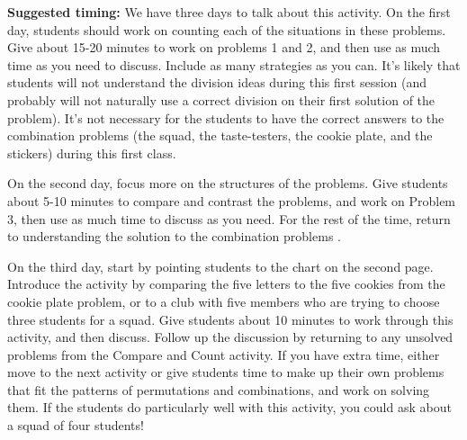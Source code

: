 \documentclass[nooutcomes, noauthor]{ximera}
\begin{document}
\begin{instructorNotes}
{\bf Suggested timing:} We have three days to talk about this activity. On the first day, students should work on counting each of the situations in these problems. Give about 15-20 minutes to work on problems 1 and 2, and then use as much time as you need to discuss. Include as many strategies as you can. It's likely that students will not understand the division ideas during this first session (and probably will not naturally use a correct division on their first solution of the problem). It's not necessary for the students to have the correct answers to the combination problems (the squad, the taste-testers, the cookie plate, and the stickers) during this first class. 

On the second day, focus more on the structures of the problems. Give students about 5-10 minutes to compare and contrast the problems, and work on Problem 3, then use as much time to discuss as you need. For the rest of the time, return to understanding the solution to the combination problems . 

On the third day, start by pointing students to the chart on the second page. Introduce the activity by comparing the five letters to the five cookies from the cookie plate problem, or to a club with five members who are trying to choose three students for a squad. Give students about 10 minutes to work through this activity, and then discuss. Follow up the discussion by returning to any unsolved problems from the Compare and Count activity. If you have extra time, either move to the next activity or give students time to make up their own problems that fit the patterns of permutations and combinations, and work on solving them. If the students do particularly well with this activity, you could ask about a squad of four students!

\end{instructorNotes}
\end{document}
